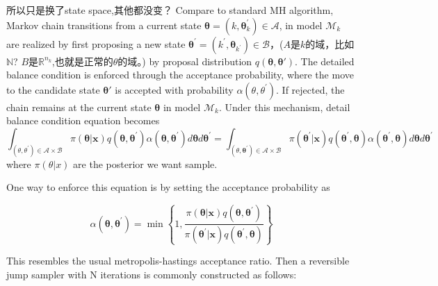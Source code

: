 \documentclass[
]{book}
\theoremstyle{definition}
\theoremstyle{definition}
\theoremstyle{definition}
\theoremstyle{remark}
\begin{document}
所以只是换了state space,其他都没变？
Compare to standard MH algorithm, Markov chain transitions from a current state \(\boldsymbol{\theta}=\left(k, \boldsymbol{\theta}_{k}^{\prime}\right) \in \mathcal{A}\), in model \(\mathcal M_k\) are realized by first proposing a new state \(\boldsymbol{\theta}^{\prime}=\left(k^{\prime}, \boldsymbol{\theta}_{k^{\prime}}\right) \in \mathcal{B}\)，(\(A\)是\(k\)的域，比如\(\mathbb N\)? \(B\)是\(\mathbb R^{n_k}\),也就是正常的\(\theta\)的域。) by proposal distribution \(q(\boldsymbol\theta,\boldsymbol \theta')\). The detailed balance condition is enforced through the acceptance probability, where the move to the candidate state \(\boldsymbol \theta'\) is accepted with probability \(\alpha\left(\theta, \theta^{\prime}\right)\). If rejected, the chain remains at the current state \(\boldsymbol \theta\) in model \(\mathcal M_k\). Under this mechanism, detail balance condition equation becomes
\[
\int_{\left(\theta, \theta^{\prime}\right) \in \mathcal{A} \times \mathcal{B}} \pi(\boldsymbol{\theta} | \mathbf{x}) q\left(\boldsymbol{\theta}, \boldsymbol{\theta}^{\prime}\right) \alpha\left(\boldsymbol{\theta}, \boldsymbol{\theta}^{\prime}\right) d \boldsymbol{\theta} d \boldsymbol{\theta}^{\prime}=\int_{\left(\theta, \boldsymbol{\theta}^{\prime}\right) \in \mathcal{A} \times \mathcal{B}} \pi\left(\boldsymbol{\theta}^{\prime} | \mathbf{x}\right) q\left(\boldsymbol{\theta}^{\prime}, \boldsymbol{\theta}\right) \alpha\left(\boldsymbol{\theta}^{\prime}, \boldsymbol{\theta}\right) d \boldsymbol{\theta} d \boldsymbol{\theta}^{\prime}
\]
where \(\pi(\theta|x)\) are the posterior we want sample.

One way to enforce this equation is by setting the acceptance probability as

\[
\alpha\left(\boldsymbol{\theta}, \boldsymbol{\theta}^{\prime}\right)=\min \left\{1, \frac{\pi(\boldsymbol{\theta} | \mathbf{x}) q\left(\boldsymbol{\theta}, \boldsymbol{\theta}^{\prime}\right)}{\pi\left(\boldsymbol{\theta}^{\prime} | \mathbf{x}\right) q\left(\boldsymbol{\theta}^{\prime}, \boldsymbol{\theta}\right)}\right\}
\]

This resembles the usual metropolis-hastings acceptance ratio. Then a reversible jump sampler with N iterations is commonly constructed as follows:
\end{document}
